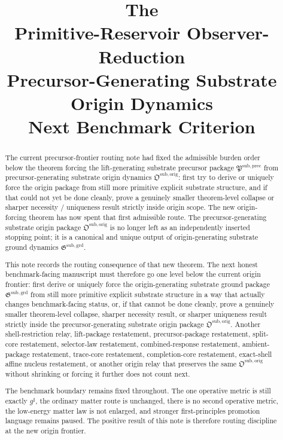 \documentclass[11pt]{article}
\title{\textbf{The \TheoryName{}}\\[0.4em]
\large Primitive-Reservoir Observer-Reduction\\
\large Precursor-Generating Substrate Origin Dynamics\\
\large Next Benchmark Criterion}
\author{}
\date{}
\newcommand{\CompletedMetric}{g^{\sharp}}
\newcommand{\PrecursorPackage}{\mathfrak P^{\mathrm{sub,prec}}}
\newcommand{\OriginPackage}{\mathfrak O^{\mathrm{sub,orig}}}
\newcommand{\GroundPackage}{\mathfrak G^{\mathrm{sub,grd}}}
\begin{document}
\maketitle

\begin{abstract}
The current precursor-frontier routing note had fixed the admissible burden order below the theorem forcing the lift-generating substrate precursor package \(\PrecursorPackage\) from precursor-generating substrate origin dynamics \(\OriginPackage\): first try to derive or uniquely force the origin package from still more primitive explicit substrate structure, and if that could not yet be done cleanly, prove a genuinely smaller theorem-level collapse or sharper necessity / uniqueness result strictly inside origin scope. The new origin-forcing theorem has now spent that first admissible route. The precursor-generating substrate origin package \(\OriginPackage\) is no longer left as an independently inserted stopping point; it is a canonical and unique output of origin-generating substrate ground dynamics \(\GroundPackage\).

This note records the routing consequence of that new theorem. The next honest benchmark-facing manuscript must therefore go one level below the current origin frontier: first derive or uniquely force the origin-generating substrate ground package \(\GroundPackage\) from still more primitive explicit substrate structure in a way that actually changes benchmark-facing status, or, if that cannot be done cleanly, prove a genuinely smaller theorem-level collapse, sharper necessity result, or sharper uniqueness result strictly inside the precursor-generating substrate origin package \(\OriginPackage\). Another shell-restriction relay, lift-package restatement, precursor-package restatement, split-core restatement, selector-law restatement, combined-response restatement, ambient-package restatement, trace-core restatement, completion-core restatement, exact-shell affine nucleus restatement, or another origin relay that preserves the same \(\OriginPackage\) without shrinking or forcing it further does not count next.

The benchmark boundary remains fixed throughout. The one operative metric is still exactly \(\CompletedMetric\), the ordinary matter route is unchanged, there is no second operative metric, the low-energy matter law is not enlarged, and stronger first-principles promotion language remains paused. The positive result of this note is therefore routing discipline at the new origin frontier.
\end{abstract}
\end{document}
